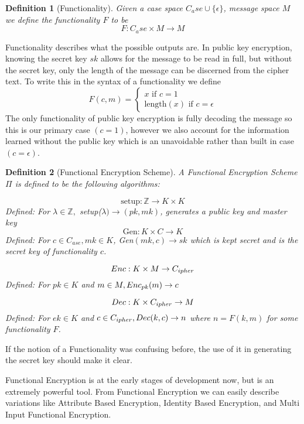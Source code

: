 \documentclass[12pt,twoside]{reedthesis}
\newtheorem{definition}{Definition}
\begin{document}
\begin{definition}[Functionality]
Given a case space $C_ase \cup \{\epsilon\}$, message space $M$ we define the functionality $F$ to be 
$$F:C_ase \times M \rightarrow M$$
\end{definition}

\par Functionality describes what the possible outputs are. In public key encryption, knowing the secret key $sk$ allows for the message to be read in full, but without the secret key, only the length of the message can be discerned from the cipher text. To write this in the syntax of a functionality we define
$$
F(c,m) = 
\begin{cases}
 x \text{ if } c = 1 \\
\text{length}(x) \text{ if } c = \epsilon
\end{cases}
$$
The only functionality of public key encryption is fully decoding the message so this is our primary case $(c = 1)$, however we also account for the information learned without the public key which is an unavoidable rather than built in case $(c = \epsilon)$.


\newcommand{\Z}[0]{\mathbb{Z}}
\begin{definition}[Functional Encryption Scheme]
A Functional Encryption Scheme $\Pi$ is defined to be the following algorithms:

$$\text{setup}: \Z \rightarrow K \times K$$
Defined: For $\lambda \in \Z,$ setup($\lambda) \rightarrow (pk,mk)$, generates a public key and master key
$$\text{Gen}: K \times C \rightarrow K $$
Defined: For $c\in C_{ase}, mk \in K$, Gen$(mk,c) \rightarrow sk$ which is kept secret and is the secret key of functionality $c$.

$$Enc: K \times M \rightarrow C_{ipher}$$
Defined: For $pk\in K$ and $m \in M, Enc_{pk}(m) \rightarrow c$

$$Dec:K \times C_{ipher} \rightarrow M$$
Defined: For $ek \in K$ and $c \in C_{ipher}, Dec(k,c) \rightarrow n$ where $n = F(k,m)$ for some functionality $F$. 
\end{definition}


If the notion of a Functionality was confusing before, the use of it in generating the secret key should make it clear.
\par Functional Encryption is at the early stages of development now, but is an extremely powerful tool. From Functional Encryption we can easily describe variations like Attribute Based Encryption, Identity Based Encryption, and Multi Input Functional Encryption.
\end{document}

